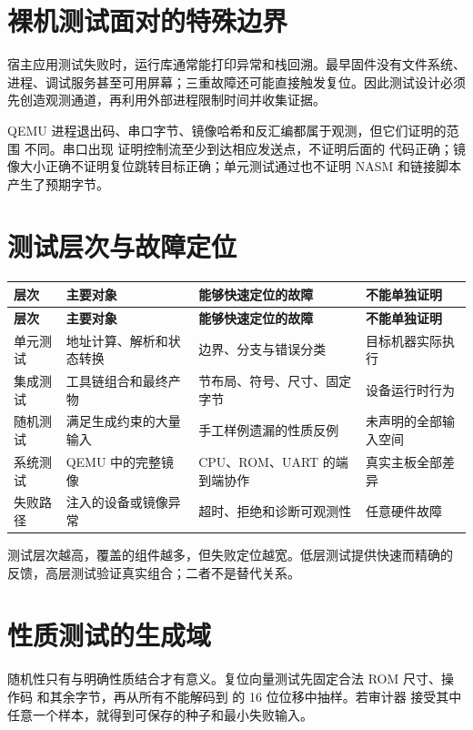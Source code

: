 \section{裸机测试面对的特殊边界}

宿主应用测试失败时，运行库通常能打印异常和栈回溯。最早固件没有文件系统、
进程、调试服务甚至可用屏幕；三重故障还可能直接触发复位。因此测试设计必须
先创造观测通道，再利用外部进程限制时间并收集证据。

QEMU 进程退出码、串口字节、镜像哈希和反汇编都属于观测，但它们证明的范围
不同。串口出现  证明控制流至少到达相应发送点，不证明后面的
代码正确；镜像大小正确不证明复位跳转目标正确；单元测试通过也不证明 NASM
和链接脚本产生了预期字节。

\section{测试层次与故障定位}

\begin{longtable}{L{0.16\textwidth}L{0.26\textwidth}L{0.25\textwidth}L{0.19\textwidth}}
\toprule
\textbf{层次} & \textbf{主要对象} & \textbf{能够快速定位的故障} & \textbf{不能单独证明}\\
\midrule
\endfirsthead
\toprule
\textbf{层次} & \textbf{主要对象} & \textbf{能够快速定位的故障} & \textbf{不能单独证明}\\
\midrule
\endhead
单元测试 & 地址计算、解析和状态转换 & 边界、分支与错误分类 & 目标机器实际执行\\
集成测试 & 工具链组合和最终产物 & 节布局、符号、尺寸、固定字节 & 设备运行时行为\\
随机测试 & 满足生成约束的大量输入 & 手工样例遗漏的性质反例 & 未声明的全部输入空间\\
系统测试 & QEMU 中的完整镜像 & CPU、ROM、UART 的端到端协作 & 真实主板全部差异\\
失败路径 & 注入的设备或镜像异常 & 超时、拒绝和诊断可观测性 & 任意硬件故障\\
\bottomrule
\end{longtable}

测试层次越高，覆盖的组件越多，但失败定位越宽。低层测试提供快速而精确的
反馈，高层测试验证真实组合；二者不是替代关系。

\section{性质测试的生成域}

随机性只有与明确性质结合才有意义。复位向量测试先固定合法 ROM 尺寸、操作码
和其余字节，再从所有不能解码到  的 16 位位移中抽样。若审计器
接受其中任意一个样本，就得到可保存的种子和最小失败输入。

